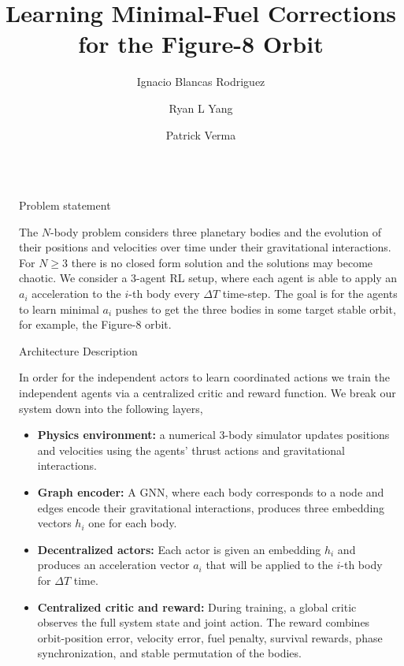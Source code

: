 \documentclass[final]{beamer}
\title{Learning Minimal-Fuel Corrections for the Figure-8 Orbit}
\author{Ignacio Blancas Rodriguez \inst{1} \and Ryan L Yang \inst{1} \and Patrick Verma \inst{1}}
\institute[shortinst]{\inst{1} Brown University}
\newlength{\sepwidth}
\newlength{\colwidth}
\newcommand{\separatorcolumn}{\begin{column}{\sepwidth}\end{column}}
\begin{document}
\begin{frame}[t]
\begin{columns}[t]
\separatorcolumn

\begin{column}{\colwidth}

  \begin{block}{Problem statement}

    The $N$-body problem considers three planetary bodies and the evolution of their positions and velocities over time under their gravitational interactions. For $N \geq 3$ there is no closed form solution and the solutions may become chaotic. We consider a 3-agent RL setup, where each agent is able to apply an $a_i$ acceleration to the $i$-th body every $\Delta T$ time-step. The goal is for the agents to learn minimal $a_i$ pushes to get the three bodies in some target stable orbit, for example, the Figure-8 orbit.

  \end{block}

  \begin{block}{Architecture Description}

    In order for the independent actors to learn coordinated actions we train the independent agents via a centralized critic and reward function. We break our system down into the following layers,

    \begin{itemize}
      \item \textbf{Physics environment:} a numerical 3-body simulator updates
      positions and velocities using the agents' thrust actions and gravitational
      interactions.

      \item \textbf{Graph encoder:} A GNN, where each body corresponds to a node and edges encode their gravitational interactions, produces three embedding vectors $h_i$ one for each body.

      \item \textbf{Decentralized actors:} Each actor is given an embedding $h_i$ and produces an acceleration vector $a_i$ that will be applied to the $i$-th body for $\Delta T$ time.

      \item \textbf{Centralized critic and reward:} During training, a global
      critic observes the full system state and joint action. The reward combines
      orbit-position error, velocity error, fuel penalty, survival rewards, phase synchronization, and stable permutation of the bodies.
    \end{itemize}


\end{block}
\end{column}
\end{columns}
\end{frame}
\end{document}
